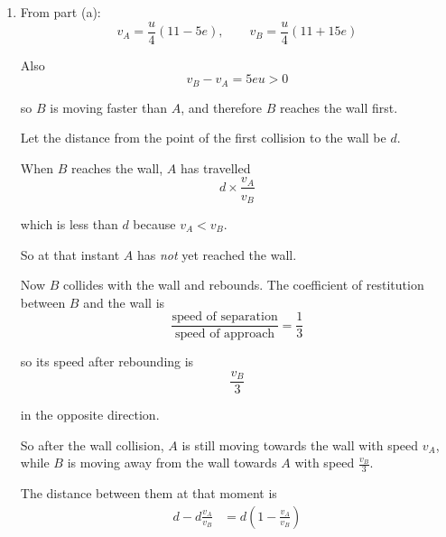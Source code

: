 \documentclass[leqno]{article}
\begin{document}
\begin{enumerate}[
  label=\textbf{\arabic*.},
  leftmargin=*,
  topsep=0pt,
  partopsep=0pt,
  parsep=0pt
]
\begin{djsSolution}
\begin{enumerate}[label=\textbf{(\alph*)}]
  Hence
  \[
  v_B=v_A+5eu
  \]

  Substitute into the momentum equation:
  \begin{align*}
  3v_A+(v_A+5eu)&=11u\\
  4v_A&=11u-5eu\\
  v_A&=\frac{u}{4}(11-5e)
  \end{align*}

  Then
  \begin{align*}
  v_B&=v_A+5eu\\
  &=\frac{u}{4}(11-5e)+5eu\\
  &=\frac{u}{4}(11-5e+20e)\\
  &=\frac{u}{4}(11+15e)
  \end{align*}

  Since $0<e\le 1$, this is positive, so $B$ moves towards the wall.

  Therefore, immediately after the collision, $B$ moves towards the wall with speed
  \[
  \frac{u}{4}(11+15e)
  \]

  \item From part (a):
  \[
  v_A=\frac{u}{4}(11-5e),\qquad v_B=\frac{u}{4}(11+15e)
  \]

  Also
  \[
  v_B-v_A=5eu>0
  \]

  so $B$ is moving faster than $A$, and therefore $B$ reaches the wall first.

  Let the distance from the point of the first collision to the wall be $d$.

  When $B$ reaches the wall, $A$ has travelled
  \[
  d\times \frac{v_A}{v_B}
  \]

  which is less than $d$ because $v_A<v_B$.

  So at that instant $A$ has \emph{not} yet reached the wall.

  Now $B$ collides with the wall and rebounds. The coefficient of restitution between $B$ and the wall is
  \[
  \frac{\text{speed of separation}}{\text{speed of approach}}=\frac13
  \]

  so its speed after rebounding is
  \[
  \frac{v_B}{3}
  \]

  in the opposite direction.

  So after the wall collision, $A$ is still moving towards the wall with speed $v_A$, while $B$ is moving away from the wall towards $A$ with speed $\frac{v_B}{3}$.

  The distance between them at that moment is
  \begin{align*}
  d-d\frac{v_A}{v_B}
  &=d\left(1-\frac{v_A}{v_B}\right)
  \end{align*}


\end{enumerate}
\end{djsSolution}
\end{enumerate}
\end{document}
